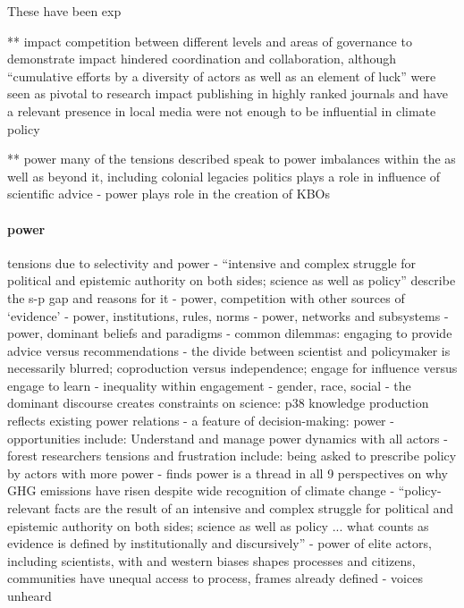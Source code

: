 These have been exp 

** impact
\cite{OjanenBKP2021} competition between different levels and areas of governance to demonstrate impact hindered coordination and collaboration, although ``cumulative efforts by a diversity of actors as well as an element of luck'' were seen as pivotal to research impact
\cite{IbarraJOBCIMRS2022} publishing in highly ranked journals and have a relevant presence in local media were not enough to be influential in climate policy

** power
\cite{OjanenBKP2021} many of the tensions described speak to power imbalances within the \SPI{} as well as beyond it, including colonial legacies
\cite{IbarraJOBCIMRS2022} politics plays a role in influence of scientific advice
\cite{MacKillopCDD2023} - power plays role in the creation of KBOs
\paragraph{power}
\cite{StrassheimK2014} tensions due to selectivity and power - ``intensive and complex struggle for political and epistemic authority on both sides; science as well as policy''
\cite{OlejniczakBDP2019} describe the s-p gap and reasons for it
\cite{CairneyO2020} - power, competition with other sources of `evidence'
\cite{CairneyO2020} - power, institutions, rules, norms
\cite{CairneyO2020} - power, networks and subsystems
\cite{CairneyO2020} - power, dominant beliefs and paradigms
\cite{CairneyO2020} - common dilemmas: engaging to provide advice versus recommendations - the divide between scientist and policymaker is necessarily blurred; coproduction versus independence; engage for influence versus engage to learn 
\cite{CairneyO2020} - inequality within engagement - gender, race, social
\cite{Carton2021} - the dominant discourse creates constraints on science: p38 knowledge production reflects existing power relations
\cite{MoallemiZHSMZHKHMGLB2023} - a feature of decision-making: power
\cite{MoallemiZHSMZHKHMGLB2023} - opportunities include: Understand and manage power dynamics with all actors
\cite{OjanenBKP2021} - forest researchers tensions and frustration include: being asked to prescribe policy by actors with more power
\cite{StoddardEtAl2021} - finds power is a thread in all 9 perspectives on why GHG emissions have risen despite wide recognition of climate change
\cite{StrassheimK2014} - ``policy-relevant facts are the result of an intensive and complex struggle for political and epistemic authority on both sides; science as well as policy ... what counts as evidence is defined by institutionally and discursively''
\cite{TurnhoutMWKL2020} - power of elite actors, including scientists, with and western biases shapes processes and citizens, communities have unequal access to process, frames already defined - voices unheard 
